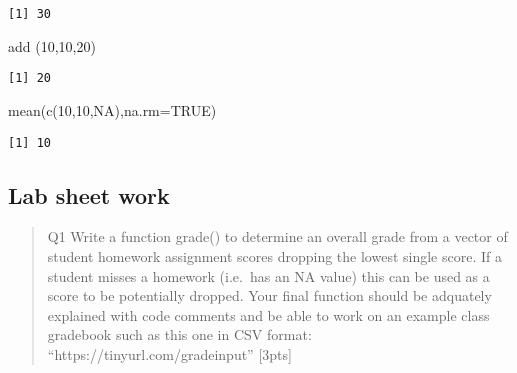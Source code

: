 \documentclass[
  letterpaper,
  DIV=11,
  numbers=noendperiod]{scrartcl}
\newenvironment{Shaded}{\begin{snugshade}}{\end{snugshade}}
\newcommand{\AttributeTok}[1]{\textcolor[rgb]{0.40,0.45,0.13}{#1}}
\newcommand{\ConstantTok}[1]{\textcolor[rgb]{0.56,0.35,0.01}{#1}}
\newcommand{\DecValTok}[1]{\textcolor[rgb]{0.68,0.00,0.00}{#1}}
\newcommand{\FunctionTok}[1]{\textcolor[rgb]{0.28,0.35,0.67}{#1}}
\newcommand{\NormalTok}[1]{\textcolor[rgb]{0.00,0.23,0.31}{#1}}
\begin{document}
\begin{verbatim}
[1] 30
\end{verbatim}

\begin{Shaded}
\begin{Highlighting}[]
\FunctionTok{add}\NormalTok{ (}\DecValTok{10}\NormalTok{,}\DecValTok{10}\NormalTok{,}\DecValTok{20}\NormalTok{)}
\end{Highlighting}
\end{Shaded}

\begin{verbatim}
[1] 20
\end{verbatim}

\begin{Shaded}
\begin{Highlighting}[]
\FunctionTok{mean}\NormalTok{(}\FunctionTok{c}\NormalTok{(}\DecValTok{10}\NormalTok{,}\DecValTok{10}\NormalTok{,}\ConstantTok{NA}\NormalTok{),}\AttributeTok{na.rm=}\ConstantTok{TRUE}\NormalTok{)}
\end{Highlighting}
\end{Shaded}

\begin{verbatim}
[1] 10
\end{verbatim}

\subsection{Lab sheet work}\label{lab-sheet-work}

\begin{quote}
Q1 Write a function grade() to determine an overall grade from a vector
of student homework assignment scores dropping the lowest single score.
If a student misses a homework (i.e.~has an NA value) this can be used
as a score to be potentially dropped. Your final function should be
adquately explained with code comments and be able to work on an example
class gradebook such as this one in CSV format:
``https://tinyurl.com/gradeinput'' {[}3pts{]}
\end{quote}
\end{document}
